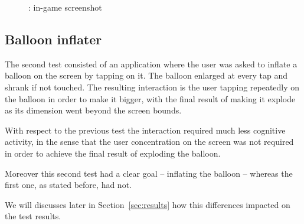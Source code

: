 \begin{figure}[h!t]
\label{fig:test1}
\centering
	{\setlength{\fboxsep}{0pt}
	 }
\caption{\testfirst: in-game screenshot}
\end{figure}

\subsection{Balloon inflater}
\label{sec:test2}
The second test consisted of an application where the user was asked to inflate a balloon on the screen by tapping on it.
The balloon enlarged at every tap and shrank if not touched.
The resulting interaction is the user tapping repeatedly on the balloon in order to make it bigger, with the final result of making it explode as its dimension went beyond the screen bounds.

With respect to the previous test the interaction required much less cognitive activity, in the sense that the user concentration on the screen was not required in order to achieve the final result of exploding the balloon.

Moreover this second test had a clear goal -- inflating the balloon -- whereas the first one, as stated before, had not.

We will discusses later in Section~\ref{sec:results} how this differences impacted on the test results.

